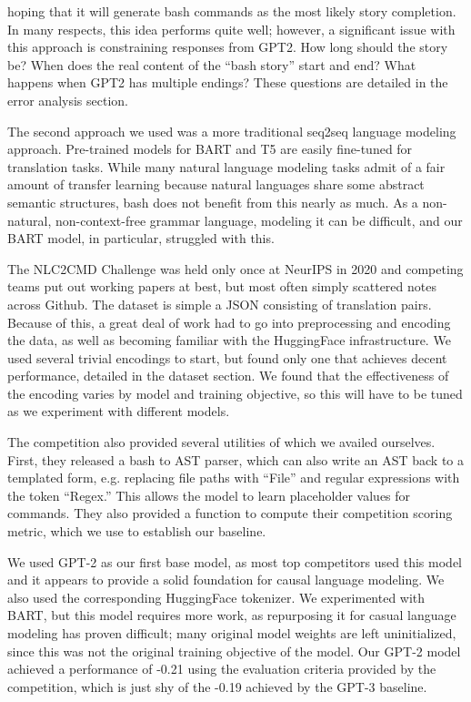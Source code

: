 \documentclass{article}
\begin{document}
hoping that it will generate bash commands as the most likely story completion.
In many respects, this idea performs quite well; however, a significant issue
with this approach is constraining responses from GPT2. How long should the
story be? When does the real content of the ``bash story'' start and end? What
happens when GPT2 has multiple endings? These questions are detailed in the
error analysis section.
\par
The second approach we used was a more traditional seq2seq language modeling
approach. Pre-trained models for BART and T5 are easily fine-tuned for
translation tasks. While many natural language modeling tasks admit of a fair
amount of transfer learning because natural languages share some abstract
semantic structures, bash does not benefit from this nearly as much. As a
non-natural, non-context-free grammar language, modeling it can be difficult,
and our BART model, in particular, struggled with this.
\par
The NLC2CMD Challenge was held only once at NeurIPS in 2020 and competing teams
put out working papers at best, but most often simply scattered notes across
Github. The dataset is simple a JSON consisting of translation pairs. Because
of this, a great deal of work had to go into preprocessing and encoding the
data, as well as becoming familiar with the HuggingFace infrastructure. We used
several trivial encodings to start, but found only one that achieves decent
performance, detailed in the dataset section. We found that the effectiveness
of the encoding varies by model and training objective, so this will have to be
tuned as we experiment with different models.
\par
The competition also provided several utilities of which we availed ourselves.
First, they released a bash to AST parser, which can also write an AST back to
a templated form, e.g. replacing file paths with ``File'' and regular
expressions with the token ``Regex.'' This allows the model to learn
placeholder values for commands. They also provided a function to compute their
competition scoring metric, which we use to establish our baseline.
\par
We used GPT-2 as our first base model, as most top competitors used this model
and it appears to provide a solid foundation for causal language modeling. We
also used the corresponding HuggingFace tokenizer. We experimented with BART,
but this model requires more work, as repurposing it for casual language
modeling has proven difficult; many original model weights are left
uninitialized, since this was not the original training objective of the model.
Our GPT-2 model achieved a performance of -0.21 using the evaluation criteria
provided by the competition, which is just shy of the -0.19 achieved by the
GPT-3 baseline.
\end{document}
